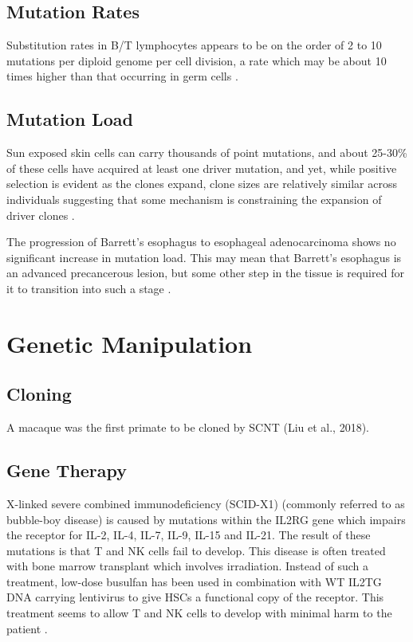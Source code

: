 \documentclass[]{book}
\begin{document}
\hypertarget{mutation-rates}{%
\subsection{Mutation Rates}\label{mutation-rates}}

Substitution rates in B/T lymphocytes appears to be on the order of 2 to 10 mutations per diploid genome per cell division, a rate which may be about 10 times higher than that occurring in germ cells \citep{lynch2010rate}.

\hypertarget{mutation-load}{%
\subsection{Mutation Load}\label{mutation-load}}

Sun exposed skin cells can carry thousands of point mutations, and about 25-30\% of these cells have acquired at least one driver mutation, and yet, while positive selection is evident as the clones expand, clone sizes are relatively similar across individuals suggesting that some mechanism is constraining the expansion of driver clones \citep{martincorena2015somatic}.

The progression of Barrett's esophagus to esophageal adenocarcinoma shows no significant increase in mutation load. This may mean that Barrett's esophagus is an advanced precancerous lesion, but some other step in the tissue is required for it to transition into such a stage \citep{gusev2014partitioning}.

\hypertarget{genetic-manipulation}{%
\section{Genetic Manipulation}\label{genetic-manipulation}}

\hypertarget{cloning}{%
\subsection{Cloning}\label{cloning}}

A macaque was the first primate to be cloned by SCNT (Liu et al., 2018).

\hypertarget{gene-therapy}{%
\subsection{Gene Therapy}\label{gene-therapy}}

X-linked severe combined immunodeficiency (SCID-X1) (commonly referred to as bubble-boy disease) is caused by mutations within the IL2RG gene which impairs the receptor for IL-2, IL-4, IL-7, IL-9, IL-15 and IL-21. The result of these mutations is that T and NK cells fail to develop. This disease is often treated with bone marrow transplant which involves irradiation. Instead of such a treatment, low-dose busulfan has been used in combination with WT IL2TG DNA carrying lentivirus to give HSCs a functional copy of the receptor. This treatment seems to allow T and NK cells to develop with minimal harm to the patient \citep{Mamcarz2019-ei}.
\end{document}

